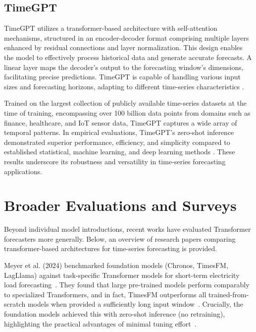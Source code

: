 \subsection{TimeGPT}

TimeGPT utilizes a transformer-based architecture with self-attention mechanisms, structured in an encoder-decoder format comprising multiple layers enhanced by residual connections and layer normalization. This design enables the model to effectively process historical data and generate accurate forecasts. A linear layer maps the decoder's output to the forecasting window's dimensions, facilitating precise predictions. TimeGPT is capable of handling various input sizes and forecasting horizons, adapting to different time-series characteristics \cite{Garza2023TimeGPT}.

Trained on the largest collection of publicly available time-series datasets at the time of training, encompassing over 100 billion data points from domains such as finance, healthcare, and IoT sensor data, TimeGPT captures a wide array of temporal patterns. In empirical evaluations, TimeGPT's zero-shot inference demonstrated superior performance, efficiency, and simplicity compared to established statistical, machine learning, and deep learning methods \cite{Garza2023TimeGPT}. These results underscore its robustness and versatility in time-series forecasting applications.


\section{Broader Evaluations and Surveys}

Beyond individual model introductions, recent works have evaluated Transformer forecasters more generally. Below, an overview of research papers comparing transformer-based architectures for time-series forecasting is provided.

Meyer et al. (2024) benchmarked foundation models (Chronos, TimesFM, LagLlama) against task-specific Transformer models for short-term electricity load forecasting~\cite{meyer2024benchmarking}. They found that large pre-trained models perform comparably to specialized Transformers, and in fact, TimesFM outperforms all trained-from-scratch models when provided a sufficiently long input window~\cite{meyer2024benchmarking}. Crucially, the foundation models achieved this with zero-shot inference (no retraining), highlighting the practical advantages of minimal tuning effort~\cite{meyer2024benchmarking}.

